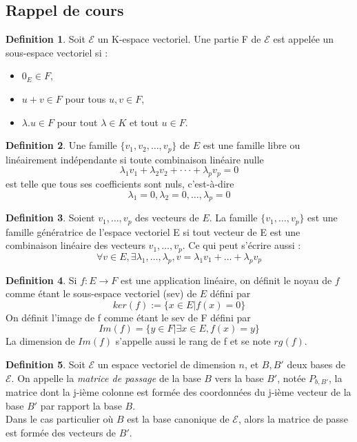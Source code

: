 \documentclass[]{book}
\theoremstyle{definition}
\newtheorem{defn}{Definition}
\newcommand{\E}{\mathscr{E}}
\begin{document}
\subsection*{Rappel de cours}

\begin{defn}
Soit $\E$ un K-espace vectoriel. Une partie F de $\E$ est appelée un sous-espace vectoriel si :
\begin{itemize}
\item $0_E \in F$,
\item $u + v \in F$ pour tous $u, v \in F$,
\item $\lambda.u \in F$ pour tout $\lambda \in K$ et tout $u \in F$.
\end{itemize}
\end{defn}


\begin{defn}
Une famille $\{v_1, v_2, \ldots , v_p\}$ de $E$ est une famille libre ou lin\'eairement ind\'ependante si toute combinaison lin\'eaire nulle
$$\lambda_1v_1 + \lambda_2v_2 + ··· + \lambda_p v_p = 0$$
est telle que tous ses coefficients sont nuls, c’est-\`a-dire
$$\lambda_1 = 0, \lambda_2 = 0, \ldots, \lambda_p = 0$$
\end{defn}



\begin{defn}
Soient $v_1, \ldots, v_p$ des vecteurs de $E$. La famille $\{v_1, \ldots, v_p\}$ est une famille g\'en\'eratrice de l'espace vectoriel E si tout vecteur de E est une combinaison lin\'eaire des vecteurs $v_1, \ldots, v_p$. Ce qui peut s'\'ecrire aussi :
$$\forall v \in E, \exists \lambda_1, \ldots, \lambda_p, v = \lambda_1 v_1 + \ldots + \lambda_p v_p$$
\end{defn}


\begin{defn}
Si $f : E \to F$ est une application lin\'eaire, on d\'efinit le noyau de $f$ comme \'etant le sous-espace vectoriel (sev) de $E$ d\'efini par
$$ker(f) := \{x \in E | f(x) = 0\}$$
On d\'efinit l'image de f comme \'etant le sev de F d\'efini par
$$Im(f) = \{y \in F| \exists x \in E, f(x) = y\}$$
La dimension de $Im(f)$ s'appelle aussi le rang de f et se note $rg(f)$.
\end{defn}

\begin{defn}
Soit $\E$ un espace vectoriel de dimension $n$, et $B, B'$ deux bases de $\E$. On appelle la \emph{matrice de passage} de la base $B$ vers la base $B'$, not\'ee $P_{b,B'}$, la matrice dont la j-i\`eme colonne est form\'ee des coordonn\'ees du j-i\`eme vecteur de la base $B'$ par rapport la base $B$. \\
Dans le cas particulier o\`u $B$ est la base canonique de $\E$, alors la matrice de passe est form\'ee des vecteurs de $B'$.
\end{defn}
\end{document}
